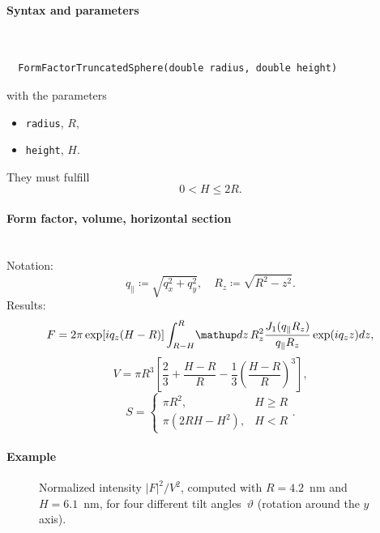 \paragraph{Syntax and parameters}\strut\\[-2ex plus .2ex minus .2ex]
\begin{lstlisting}
  FormFactorTruncatedSphere(double radius, double height)
\end{lstlisting}
with the parameters
\begin{itemize}
\item \texttt{radius}, $R$,
\item \texttt{height}, $H$.
\end{itemize}
They must fulfill
\begin{displaymath}
   0 < H\leq 2R.
\end{displaymath}

\paragraph{Form factor, volume, horizontal section}\strut\\
Notation:
\begin{equation*}
  q_{\parallel} \coloneqq \sqrt{q_x^2+q_y^2},\quad
  R_z \coloneqq \sqrt{R^2-z^2}.
\end{equation*}
Results:
\begin{equation*}
F= 2\pi \exp[i q_z (H-R)]\int_{R-H}^{R}\!\d z\, R_z^2
       \frac{J_1(q_{\parallel} R_z) }{q_{\parallel} R_z} \exp(i q_z z) dz,
\end{equation*}
\begin{equation*}
  V=\pi R^3 \left[\dfrac{2}{3} + \dfrac{H-R}{R} - \dfrac{1}{3}\left(\dfrac{H-R}{R}\right)^3\right],
\end{equation*}
\begin{equation*}
  S = \left\{\begin{array}{ll} \pi R^2, & H \geq R \\
         \pi\left(2RH-H^2\right), & H < R \end{array}\right..
\end{equation*}

\paragraph{Example}\strut

\begin{figure}[H]
\begin{center}
\end{center}
\caption{Normalized intensity $|F|^2/V^2$,
computed with $R=4.2$~nm and $H=6.1$~nm,
for four different tilt angles~$\vartheta$ (rotation around the $y$ axis).}
\end{figure}

